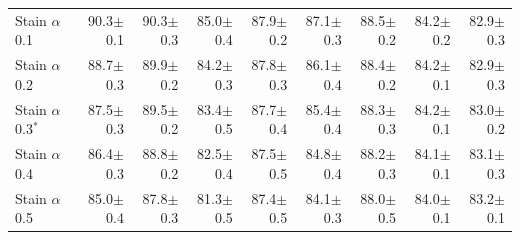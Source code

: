 \begin{table}[H]
\begin{tabular}{lrrrrrrrr}
\addlinespace
Stain $\alpha$ 0.1 & 90.3{\scriptsize$\pm$0.1} & 90.3{\scriptsize$\pm$0.3} & 85.0{\scriptsize$\pm$0.4} & 87.9{\scriptsize$\pm$0.2} & 87.1{\scriptsize$\pm$0.3} & 88.5{\scriptsize$\pm$0.2} & 84.2{\scriptsize$\pm$0.2} & 82.9{\scriptsize$\pm$0.3} \\
Stain $\alpha$ 0.2 & 88.7{\scriptsize$\pm$0.3} & 89.9{\scriptsize$\pm$0.2} & 84.2{\scriptsize$\pm$0.3} & 87.8{\scriptsize$\pm$0.3} & 86.1{\scriptsize$\pm$0.4} & 88.4{\scriptsize$\pm$0.2} & 84.2{\scriptsize$\pm$0.1} & 82.9{\scriptsize$\pm$0.3} \\
Stain $\alpha$ 0.3$^{*}$ & 87.5{\scriptsize$\pm$0.3} & 89.5{\scriptsize$\pm$0.2} & 83.4{\scriptsize$\pm$0.5} & 87.7{\scriptsize$\pm$0.4} & 85.4{\scriptsize$\pm$0.4} & 88.3{\scriptsize$\pm$0.3} & 84.2{\scriptsize$\pm$0.1} & 83.0{\scriptsize$\pm$0.2} \\
Stain $\alpha$ 0.4 & 86.4{\scriptsize$\pm$0.3} & 88.8{\scriptsize$\pm$0.2} & 82.5{\scriptsize$\pm$0.4} & 87.5{\scriptsize$\pm$0.5} & 84.8{\scriptsize$\pm$0.4} & 88.2{\scriptsize$\pm$0.3} & 84.1{\scriptsize$\pm$0.1} & 83.1{\scriptsize$\pm$0.3} \\
Stain $\alpha$ 0.5 & 85.0{\scriptsize$\pm$0.4} & 87.8{\scriptsize$\pm$0.3} & 81.3{\scriptsize$\pm$0.5} & 87.4{\scriptsize$\pm$0.5} & 84.1{\scriptsize$\pm$0.3} & 88.0{\scriptsize$\pm$0.5} & 84.0{\scriptsize$\pm$0.1} & 83.2{\scriptsize$\pm$0.1} \\
\bottomrule
\end{tabular}
\end{table}